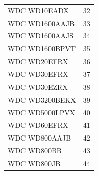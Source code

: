 \documentclass[12pt]{article}
\begin{document}
\begin{table}[H]
\begin{tabular}{lr}
  WDC WD10EADX &  32 \\ 
  WDC WD1600AAJB &  33 \\ 
  WDC WD1600AAJS &  34 \\ 
  WDC WD1600BPVT &  35 \\ 
  WDC WD20EFRX &  36 \\ 
  WDC WD30EFRX &  37 \\ 
  WDC WD30EZRX &  38 \\ 
  WDC WD3200BEKX &  39 \\ 
  WDC WD5000LPVX &  40 \\ 
  WDC WD60EFRX &  41 \\ 
  WDC WD800AAJB &  42 \\ 
  WDC WD800BB &  43 \\ 
  WDC WD800JB &  44 \\ 
   \hline
\end{tabular}
\end{table}


\end{document}
